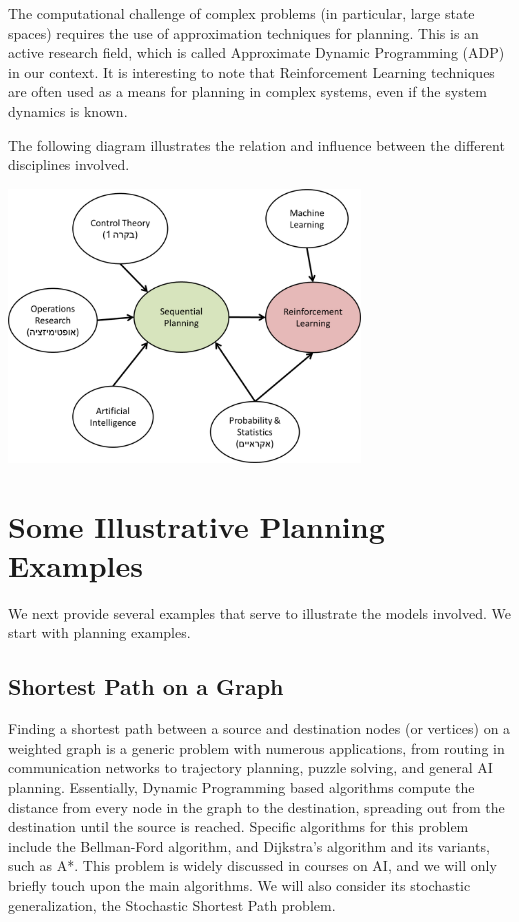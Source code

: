 The computational challenge of complex problems (in particular, large state spaces) requires the use of approximation techniques for planning. This is an active research field, which is called Approximate Dynamic Programming (ADP) in our context. It is interesting to note that Reinforcement Learning techniques are often used as a means for planning in complex systems, even if the system dynamics is known.

The following diagram illustrates the relation and influence between the different disciplines involved.

  \begin{centering}
  \includegraphics[width=0.7\textwidth]{lecture1_disciplines}\\
  \end{centering}

\section{Some Illustrative Planning Examples}
We next provide several examples that serve to illustrate the models involved. We start with planning examples.

\subsection{Shortest Path on a Graph}
Finding a shortest path between a source and destination nodes (or vertices) on a weighted graph is a generic problem with numerous applications, from routing in communication networks to trajectory planning, puzzle solving, and general AI planning. Essentially, Dynamic Programming based algorithms compute the distance from every node in the graph to the destination, spreading out from the destination until the source is reached. Specific algorithms for this problem include the Bellman-Ford algorithm, and Dijkstra's algorithm and its variants, such as A*.
This problem is widely discussed in courses on AI, and we will only briefly touch upon the main algorithms. We will also consider its stochastic generalization, the Stochastic Shortest Path problem.

